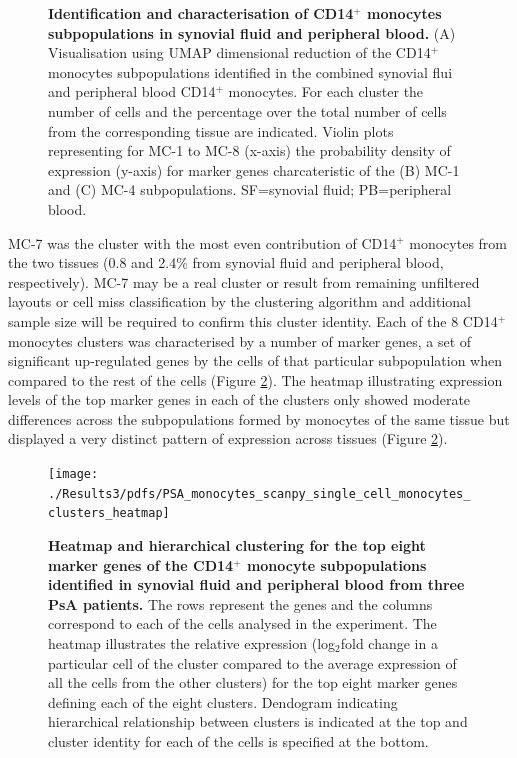 \begin{figure}[H]
	\caption[Identification and characterisation of CD14$^+$ monocytes subpopulations in synovial fluid and peripheral blood.]{\textbf{Identification and characterisation of CD14$^+$ monocytes subpopulations in synovial fluid and peripheral blood.} (A) Visualisation using UMAP dimensional reduction of the CD14$^+$ monocytes subpopulations identified in the combined synovial flui and peripheral blood CD14$^+$ monocytes. For each cluster the number of cells and the  percentage over the total number of cells from the corresponding tissue are indicated. Violin plots representing for MC-1 to MC-8 (x-axis) the probability density of expression (y-axis) for marker genes charcateristic of the (B) MC-1 and (C) MC-4 subpopulations. SF=synovial fluid; PB=peripheral blood.}
\label{figure:PsA_scRNAseq_SF_an_PB_monocytes_clusters_and_vln_plots}
\end{figure}

MC-7 was the cluster with the most even contribution of CD14$^+$ monocytes from the two tissues (0.8 and 2.4\% from synovial fluid and peripheral blood, respectively). MC-7 may be a real cluster or result from remaining unfiltered layouts or cell miss classification by the clustering algorithm and additional sample size will be required to confirm this cluster identity. Each of the 8 CD14$^+$ monocytes clusters was characterised by a number of marker genes, a set of significant up-regulated genes by the cells of that particular subpopulation when compared to the rest of the cells (Figure \ref{figure:PSA_scRNAseq_SF_PB_heatmap_8_top_markers}). The heatmap illustrating expression levels of the top marker genes in each of the clusters only showed moderate differences across the subpopulations formed by monocytes of the same tissue but displayed a very distinct pattern of expression across tissues (Figure \ref{figure:PSA_scRNAseq_SF_PB_heatmap_8_top_markers}). 


\begin{figure}[htbp]
\centering
\texttt{[image: ./Results3/pdfs/PSA\_monocytes\_scanpy\_single\_cell\_monocytes\_clusters\_heatmap]}
\caption[Heatmap and hierarchical clustering for the top eight marker genes of the CD14$^+$ monocyte subpopulations identified in synovial fluid and peripheral blood from three PsA patients.]{\textbf{Heatmap and hierarchical clustering for the top eight marker genes of the CD14$^+$ monocyte subpopulations identified in synovial fluid and peripheral blood from three PsA patients.} The rows represent the genes and the columns correspond to each of the cells analysed in the experiment. The heatmap illustrates the relative expression (log$_2$fold change in a particular cell of the cluster compared to the average expression of all the cells from the other clusters) for the top eight marker genes defining each of the eight clusters. Dendogram indicating hierarchical relationship between clusters is indicated at the top and cluster identity for each of the cells is specified at the bottom.}
\label{figure:PSA_scRNAseq_SF_PB_heatmap_8_top_markers}
\end{figure}


